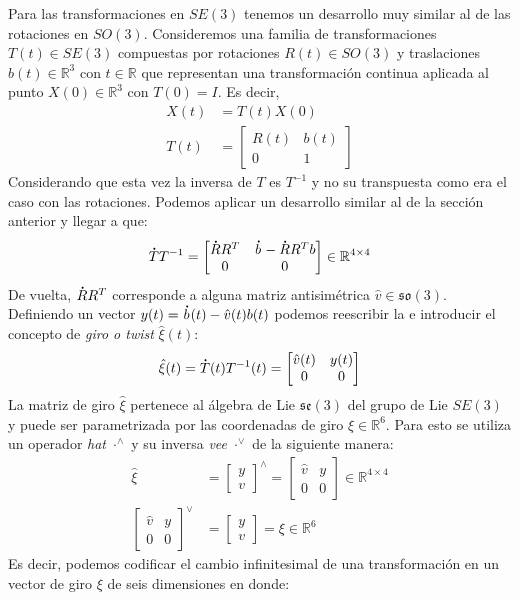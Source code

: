 \documentclass[ twoside,openright,titlepage,numbers=noenddot,%
                headinclude,footinclude,cleardoublepage=empty,abstract=on,
                BCOR=-5mm,paper=a4,fontsize=11pt
                ]{scrreprt}
\newcommand{\R}{\mathbb{R}}
\newcommand{\RR}[1]{\R^{#1 \times #1}}
\newcommand{\so}[1]{\mathfrak{so(#1)}}
\newcommand{\se}[1]{\mathfrak{se(#1)}}
\renewcommand{\dot}[1] {\overset{\,_{\mbox{\Large .}}}{#1}}
\begin{document}
Para las transformaciones en \(SE(3)\) tenemos un desarrollo muy similar
al de las rotaciones en \(SO(3)\). Consideremos una familia de
transformaciones \(T(t) \in SE(3)\) compuestas por rotaciones
\(R(t) \in SO(3)\) y traslaciones \(b(t) \in \R^3\) con \(t \in \R\) que
representan una transformación continua aplicada al punto
\(X(0) \in \R^3\) con \(T(0) = I\). Es decir, \begin{align}
X(t) &= T(t)X(0) \\
T(t) &= \begin{bmatrix}
R(t) & b(t) \\
0 & 1
\end{bmatrix}
\end{align} Considerando que esta vez la inversa de \(T\) es \(T^{-1}\)
y no su transpuesta como era el caso con las rotaciones. Podemos aplicar
un desarrollo similar al de la sección anterior y llegar a que:
\begin{align} \label{eq:translation-deriv}
\dot{T}T^{-1} = \begin{bmatrix}
\dot{R}R^T & \dot{b} - \dot{R} R^T b \\
0 & 0
\end{bmatrix} \in \RR4
\end{align} De vuelta, \(\dot{R}R^T\) corresponde a alguna matriz
antisimétrica \(\hat{v} \in \so3\). Definiendo un vector
\(y(t) = \dot{b}(t) - \hat{v}(t) b(t)\) podemos reescribir la
 e introducir el concepto de \emph{giro o
twist} \(\hat{\xi}(t)\): \begin{align}
\hat{\xi}(t) = \dot{T}(t)T^{-1}(t) = \begin{bmatrix}
\hat{v}(t) & y(t) \\
0 & 0
\end{bmatrix}
\end{align} La matriz de giro \(\hat{\xi}\) pertenece al álgebra de Lie
\(\se3\) del grupo de Lie \(SE(3)\) y puede ser parametrizada por las
coordenadas de giro \(\xi \in \R^6\). Para esto se utiliza un operador
\emph{hat} \(\cdot^{\wedge}\) y su inversa \emph{vee} \(\cdot^{\vee}\)
de la siguiente manera: \begin{align}
\hat{\xi} &= {\begin{bmatrix}y \\ v\end{bmatrix}}^{\wedge} = \begin{bmatrix}\hat{v} &
y \\ 0 & 0 \end{bmatrix} \in \RR4 \\
{\begin{bmatrix}\hat{v} & y \\ 0 & 0 \end{bmatrix}}^{\vee} &= \begin{bmatrix}y \\
v\end{bmatrix} = \xi \in \R^6
\end{align} Es decir, podemos codificar el cambio infinitesimal de una
transformación en un vector de giro \(\xi\) de seis dimensiones en
donde: \bigbreak
\end{document}
